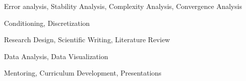 \begin{cventries}
  {
    \begin{cvitems}
    \item Error analysis, Stability Analysis, Complexity Analysis, Convergence Analysis
    \item Conditioning, Discretization
    \end{cvitems}
  }

  {
    \begin{cvitems}
    \item Research Design, Scientific Writing, Literature Review
    \item Data Analysis, Data Visualization
    \item Mentoring, Curriculum Development, Presentations
    \end{cvitems}
  }

\end{cventries}
